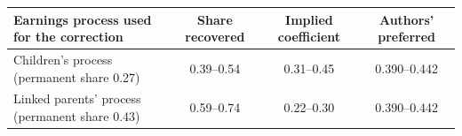 \begin{tabular}{@{}lccc@{}}
\toprule
Earnings process used for the correction & Share recovered & Implied coefficient & Authors' preferred \\
\midrule
Children's process (permanent share 0.27) & 0.39--0.54 & 0.31--0.45 & 0.390--0.442 \\
Linked parents' process (permanent share 0.43) & 0.59--0.74 & 0.22--0.30 & 0.390--0.442 \\
\bottomrule
\end{tabular}
